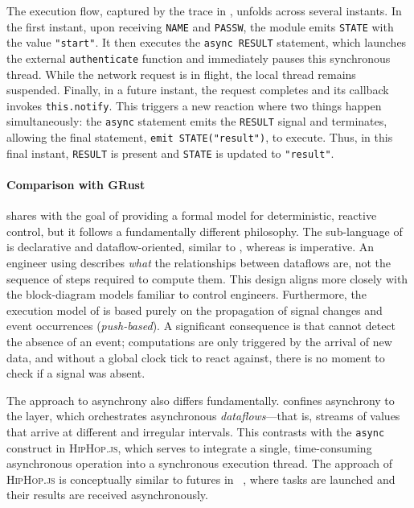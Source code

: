 The execution flow, captured by the trace in , unfolds across
several instants. In the first instant, upon receiving \texttt{NAME} and \texttt{PASSW}, the module
emits \texttt{STATE} with the value \texttt{"start"}. It then executes the \texttt{async RESULT} statement,
which launches the external \texttt{authenticate} function and immediately pauses this synchronous
thread. While the network request is in flight, the local thread remains suspended. Finally, in a
future instant, the request completes and its callback invokes \texttt{this.notify}. This triggers a
new reaction where two things happen simultaneously: the \texttt{async} statement emits the
\texttt{RESULT} signal and terminates, allowing the final statement, \texttt{emit STATE("result")},
to execute. Thus, in this final instant, \texttt{RESULT} is present and \texttt{STATE} is updated to
\texttt{"result"}.

\paragraph*{Comparison with GRust}
\GRust shares with \Esterel the goal of providing a formal model for deterministic, reactive
control, but it follows a fundamentally different philosophy. The \GRSync sub-language of \GRust is
declarative and dataflow-oriented, similar to \Lustre, whereas \Esterel is imperative. An engineer
using \GRust describes \emph{what} the relationships between dataflows are, not the sequence of
steps required to compute them. This design aligns \GRust more closely with the block-diagram models
familiar to control engineers. Furthermore, the execution model of \GRust is based purely on the
propagation of signal changes and event occurrences (\emph{push-based}). A significant consequence
is that \GRust cannot detect the absence of an event; computations are only triggered by the arrival
of new data, and without a global clock tick to react against, there is no moment to check if a
signal was absent.

The approach to asynchrony also differs fundamentally. \GRust confines asynchrony to the \GRFRP
layer, which orchestrates asynchronous \emph{dataflows}---that is, streams of values that arrive at
different and irregular intervals. This contrasts with the \texttt{async} construct in
\textsc{HipHop.js}, which serves to integrate a single, time-consuming asynchronous operation into
a synchronous execution thread. The approach of \textsc{HipHop.js} is conceptually similar to
futures in \Lustre~\cite{DBLP:conf/emsoft/CohenGP12}, where tasks are launched and their results
are received asynchronously.

